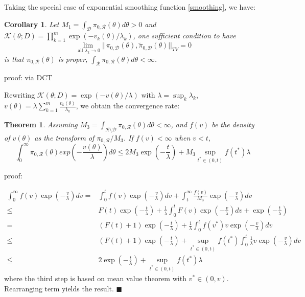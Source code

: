 \documentclass[10pt]{article}
\newtheorem{theorem}{Theorem}
\newtheorem{corollary}{Corollary}
\newcommand{\mc}[1]{\mathcal{#1}}
\DeclareMathOperator{\1}{\mathbbm{1}}
\begin{document}
Taking the special case of exponential smoothing function \eqref{smoothing}, we have:
\begin{corollary}
Let $M_1= \int_{\mc D} \pi_{0,\mc R}(\theta)d\theta>0$ and $\mc K(\theta; D) = \prod_{k=1}^m \exp( -v_k(\theta)/\lambda_k)$, one sufficient condition to have
$$\lim_{\text{ all } \lambda_k\rightarrow 0}||\pi_{0,\mc D}(\theta), \tilde{\pi}_{0,\mc D}(\theta) ||_{TV} = 0$$
is that $\pi_{0,\mc R}(\theta)$ is proper, $\int_{\mc R} \pi_{0,\mc R}(\theta) d\theta<\infty$.
\end{corollary}
proof:
{via DCT}

Rewriting $\mc K(\theta; D) = \exp(-v(\theta)/\lambda)$ with $\lambda = \sup_k \lambda_k$, $v(\theta)=\lambda\sum_{k=1}^m\frac{ v_k(\theta)}{\lambda_k}$, we obtain the convergence rate:

\begin{theorem}
Assuming $M_3= \int_{\mc R \setminus \mc D} \pi_{0,\mc R}(\theta) d\theta<\infty$, and $f(v)$ be the density of $v(\theta)$ as the transform of $\pi_{0,\mc R}/M_3$. If $f(v) < \infty$ when $v<t$,
$$\int_0^\infty {\pi_{0,\mc R}(\theta)}exp(- \frac{v(\theta)}{\lambda}) d \theta \le 
2 {M_3} \exp(-\frac{t}{\lambda}) + {M_3} \sup_{t^*\in(0,t)} {f(t^*)}\lambda 
$$
\end{theorem}
proof:

\begin{equation}
\begin{aligned}
\int_0^\infty {f(v)} \exp(- \frac{v}{\lambda}) d v
= & \int_0^t {f(v)} \exp(- \frac{v}{\lambda}) d v + \int_t^\infty \frac{f(v)}{M_3} \exp(- \frac{v}{\lambda}) d v \\
\le & {F(t)} \exp(-\frac{t}{\lambda}) + 
\frac{1}{\lambda}\int_0^t {F(v)} \exp(-\frac{v}{\lambda})dv + \exp(-\frac{t}{\lambda}) \\
= & ({F(t)} +1) \exp(-\frac{t}{\lambda}) + 
\frac{1}{\lambda}\int_0^t {f(v^*)} v\exp(-\frac{v}{\lambda})dv \\
\le & ({F(t)} +1) \exp(-\frac{t}{\lambda}) + \sup_{t^*\in(0,t)} {f(t^*)}
\int_0^t  \frac{1}{\lambda}v\exp(-\frac{v}{\lambda})dv \\
\le & 2 \exp(-\frac{t}{\lambda}) + \sup_{t^*\in(0,t)} {f(t^*)}\lambda 
\end{aligned}
\end{equation}
where the third step is based on mean value theorem with $v^*\in (0,v)$. Rearranging term yields the result.  $\blacksquare$
\end{document}
